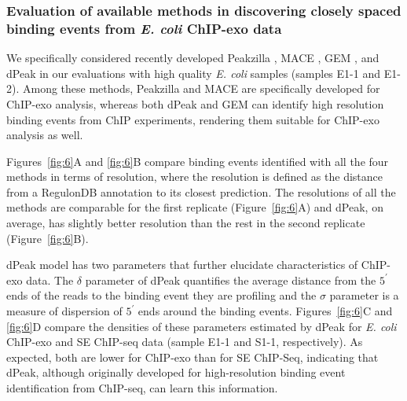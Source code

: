 \documentclass{bmcart}
\begin{document}
\subsubsection*{Evaluation of available methods in discovering closely
  spaced binding events from \textit{E. coli} ChIP-exo  data}

We specifically considered recently developed Peakzilla
\cite{peakzilla}, MACE \cite{mace}, GEM \cite{gem}, and dPeak
\cite{dpeak} in our evaluations with high quality \textit{E. coli}
samples (samples E1-1 and E1-2). Among these methods, Peakzilla and
MACE are specifically developed for ChIP-exo analysis, whereas both
dPeak and GEM can identify high resolution binding events from ChIP
experiments, rendering them suitable for ChIP-exo analysis as well.

Figures~\ref{fig:6}A and \ref{fig:6}B compare binding events
identified with all the four methods in terms of resolution, where the
resolution is defined as the distance from a RegulonDB
\cite{regulondb} annotation to its closest prediction. The resolutions
of all the methods are comparable for the first replicate
(Figure~\ref{fig:6}A) and dPeak, on average, has slightly better
resolution than the rest in the second replicate
(Figure~\ref{fig:6}B).

dPeak model has two parameters that further elucidate characteristics
of ChIP-exo data.  The $\delta$ parameter of dPeak quantifies the
average distance from the $5^{\prime}$ ends of the reads to the
binding event they are profiling and the $\sigma$ parameter is a
measure of dispersion of $5^{\prime}$ ends around the binding events.
Figures~\ref{fig:6}C and \ref{fig:6}D compare the densities of these
parameters estimated by dPeak for \textit{E. coli} ChIP-exo and SE
ChIP-seq data (sample E1-1 and S1-1, respectively). As expected, both
are lower for ChIP-exo than for SE ChIP-Seq, indicating that dPeak,
although originally developed for high-resolution binding event
identification from ChIP-seq, can learn this information.
\end{document}

